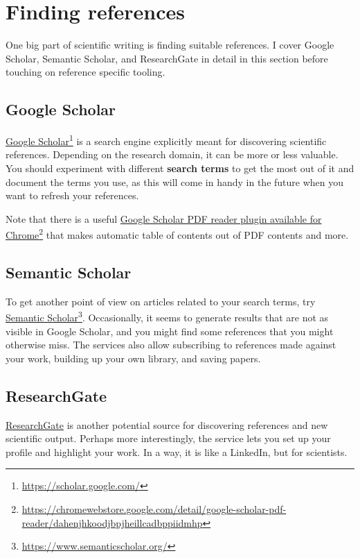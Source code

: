 \section{Finding references}

One big part of scientific writing is finding suitable references.
I cover Google Scholar, Semantic Scholar, and ResearchGate in detail in this section before touching on reference specific tooling.

\subsection{Google Scholar}

\href{https://scholar.google.com/}{Google Scholar}\footnote{\url{https://scholar.google.com/}} is a search engine explicitly meant for discovering scientific references.
Depending on the research domain, it can be more or less valuable. You should experiment with different \textbf{search terms} to get the most out of it and document the terms you use, as this will come in handy in the future when you want to refresh your references.

Note that there is a useful \href{https://chromewebstore.google.com/detail/google-scholar-pdf-reader/dahenjhkoodjbpjheillcadbppiidmhp}{Google Scholar PDF reader plugin available for Chrome}\footnote{\url{https://chromewebstore.google.com/detail/google-scholar-pdf-reader/dahenjhkoodjbpjheillcadbppiidmhp}} that makes automatic table of contents out of PDF contents and more.

\subsection{Semantic Scholar}

To get another point of view on articles related to your search terms, try \href{https://www.semanticscholar.org/}{Semantic Scholar}\footnote{\url{https://www.semanticscholar.org/}}.
Occasionally, it seems to generate results that are not as visible in Google Scholar, and you might find some references that you might otherwise miss.
The services also allow subscribing to references made against your work, building up your own library, and saving papers.

\subsection{ResearchGate}

\href{https://www.researchgate.net/}{Research\-Gate} is another potential source for discovering references and new scientific output.
Perhaps more interestingly, the service lets you set up your profile and highlight your work. In a way, it is like a LinkedIn, but for scientists.

